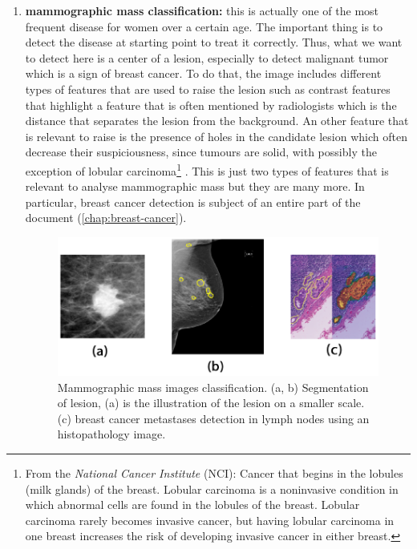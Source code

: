 \documentclass[11pt, openany]{report}
\theoremstyle{plain}
\theoremstyle{definition}
\theoremstyle{remark}
\begin{document}
\begin{enumerate}
\item \textbf{mammographic mass classification:} this is actually one of the most frequent disease for women over a certain age. The important thing is to detect the disease at starting point to treat it correctly. Thus, what we want to detect here is a center of a lesion, especially to detect malignant tumor which is a sign of breast cancer.  To do that, the image includes different types of features that are used to raise the lesion such as contrast features that highlight a feature that is often mentioned by radiologists which is the distance that separates the lesion from the background. An other feature that is relevant to raise is the presence of holes in the candidate lesion which often decrease their suspiciousness, since tumours are solid, with possibly the exception of lobular carcinoma\footnote{From the \textit{National Cancer Institute} (NCI): Cancer that begins in the lobules (milk glands) of the breast. Lobular carcinoma is a noninvasive condition in which abnormal cells are found in the lobules of the breast. Lobular carcinoma rarely becomes invasive cancer, but having lobular carcinoma in one breast increases the risk of developing invasive cancer in either breast.} \cite{breast-cancer-2}. This is just two types of features that is relevant to analyse mammographic mass but they are many more.  In particular, breast cancer detection is subject of an entire part of the document (\autoref{chap:breast-cancer}).

\begin{figure}[h]
  \centering
  \includegraphics[scale=0.4]{figures/breast-images-examples.png}
  \caption{Mammographic mass images classification. (a, b) Segmentation of lesion, (a) is the illustration of the lesion on a smaller scale. \cite{breast-cancer-2} (c) breast cancer metastases detection in lymph nodes using an histopathology image.}
  \label{fig:breast-example}
\end{figure}


\end{enumerate}
\end{document}
